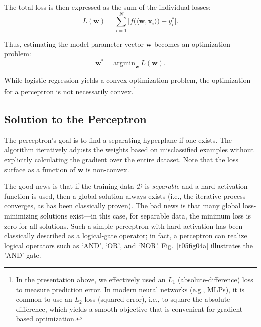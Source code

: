 \documentclass[12pt]{article}
\begin{document}
The total loss is then expressed as the sum of the individual losses:
\[
L(\bm{w}) = \sum_{i = 1}^{N} \bigl| f\bigl(\langle \bm{w}, \bm{x}_i\rangle\bigr) - y_i^* \bigr|.
\]

Thus, estimating the model parameter vector \(\bm{w}\) becomes an optimization problem:
\begin{equation}
    \bm{w}^* = \mathrm{argmin}_{\bm{w}}\, L(\bm{w}).
    \label{t05eq08}
\end{equation}

While logistic regression yields a convex optimization problem, the optimization for a perceptron is not necessarily convex.\footnote{In the presentation above, we effectively used an $L_1$ (absolute-difference) loss to measure prediction error. In modern neural networks (e.g., MLPs), it is common to use an $L_2$ loss (squared error), i.e., to square the absolute difference, which yields a smooth objective that is convenient for gradient-based optimization.}

\subsection{Solution to the Perceptron}
The perceptron’s goal is to find a separating hyperplane if one exists. The algorithm iteratively adjusts the weights based on misclassified examples without explicitly calculating the gradient over the entire dataset. Note that the loss surface as a function of \(\bm{w}\) is non-convex.

The good news is that if the training data \(\mathcal{D}\) is \textit{separable} and a hard-activation function is used, then a global solution always exists (i.e., the iterative process converges, as has been classically proven). The bad news is that many global loss-minimizing solutions exist—in this case, for separable data, the minimum loss is zero for all solutions. Such a simple perceptron with hard-activation has been classically described as a logical-gate operator; in fact, a perceptron can realize logical operators such as `AND', `OR', and `NOR'. Fig.~\ref{t05fig04a} illustrates the 'AND' gate.
\end{document}
